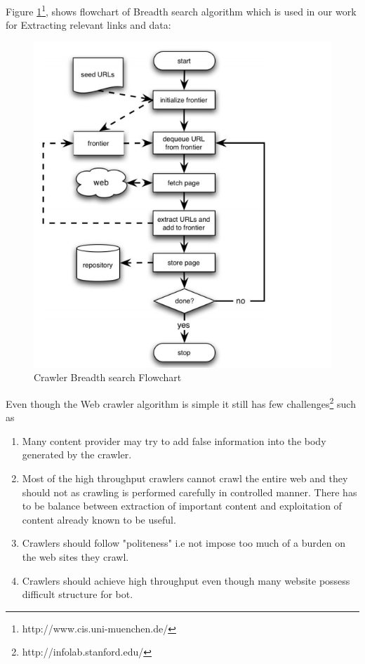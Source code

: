 \documentclass[article,type=msc,colorback,accentcolor=tud9c,twoside,11pt]{tudthesis}
\begin{document}
Figure \ref{fig:CrawlerAlgorithFlowchart}\footnote{http://www.cis.uni-muenchen.de/}, shows flowchart of Breadth search algorithm which is used in our work for Extracting relevant links and data:
\begin{figure}[h]
	\centering
	\includegraphics[scale=0.9]{CrawlerAlgorithFlowchart}
	\caption{Crawler Breadth search Flowchart}
	\label{fig:CrawlerAlgorithFlowchart}
\end{figure}
Even though the Web crawler algorithm is simple it still has few challenges\footnote{http://infolab.stanford.edu/} such as
\begin{enumerate}
\item Many content provider may try to add false information into the body generated by the crawler.
\item Most of the high throughput crawlers cannot crawl the entire web and they should not as crawling is performed carefully in controlled manner. There has to be balance between extraction of important content and exploitation of content already known to be useful.
\item Crawlers should follow "politeness" i.e not impose too much of a burden on the web sites they crawl.
\item Crawlers should achieve high throughput even though many website possess difficult structure for bot.
\end{enumerate}
\end{document}
